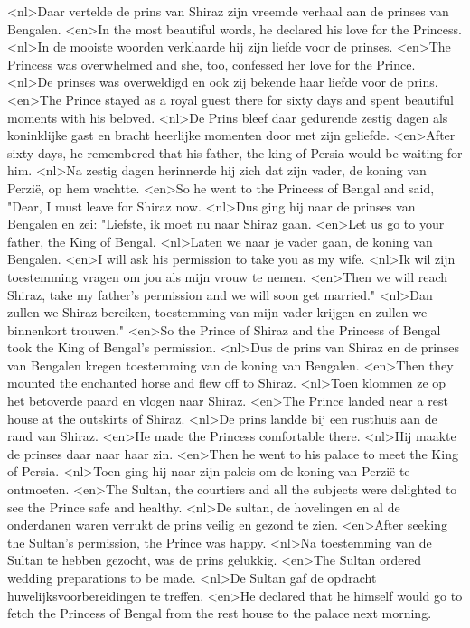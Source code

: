 <nl>Daar vertelde de prins van Shiraz zijn vreemde verhaal aan de prinses van Bengalen.
<en>In the most beautiful words, he declared his love for the Princess.
<nl>In de mooiste woorden verklaarde hij zijn liefde voor de prinses.
<en>The Princess was overwhelmed and she, too, confessed her love for the Prince.
<nl>De prinses was overweldigd en ook zij bekende haar liefde voor de prins.
<en>The Prince stayed as a royal guest there for sixty days and spent beautiful moments with his beloved.
<nl>De Prins bleef daar gedurende zestig dagen als koninklijke gast en bracht heerlijke momenten door met zijn geliefde.
<en>After sixty days, he remembered that his father, the king of Persia would be waiting for him.
<nl>Na zestig dagen herinnerde hij zich dat zijn vader, de koning van Perzië, op hem  wachtte.
<en>So he went to the Princess of Bengal and said, "Dear, I must leave for Shiraz now.
<nl>Dus ging hij naar de prinses van Bengalen en zei: "Liefste, ik moet nu naar Shiraz gaan.
<en>Let us go to your father, the King of Bengal.
<nl>Laten we naar je vader gaan, de koning van Bengalen.
<en>I will ask his permission to take you as my wife.
<nl>Ik wil zijn toestemming vragen om jou als mijn vrouw te nemen.
<en>Then we will reach Shiraz, take my father's permission and we will soon get married."
<nl>Dan zullen we Shiraz bereiken, toestemming van mijn vader krijgen en zullen we binnenkort trouwen."
<en>So the Prince of Shiraz and the Princess of Bengal took the King of Bengal's permission.
<nl>Dus de prins van Shiraz en de prinses van Bengalen kregen toestemming van de koning van Bengalen.
<en>Then they mounted the enchanted horse and flew off to Shiraz.
<nl>Toen klommen ze op het betoverde paard en vlogen naar Shiraz.
<en>The Prince landed near a rest house at the outskirts of Shiraz.
<nl>De prins landde bij een rusthuis aan de rand van Shiraz.
<en>He made the Princess comfortable there.
<nl>Hij maakte de prinses daar naar haar zin.
<en>Then he went to his palace to meet the King of Persia.
<nl>Toen ging hij naar zijn paleis om de koning van Perzië te ontmoeten.
<en>The Sultan, the courtiers and all the subjects were delighted to see the Prince safe and healthy.
<nl>De sultan, de hovelingen en al de onderdanen waren verrukt  de prins veilig en gezond te zien.
<en>After seeking the Sultan's permission, the Prince was happy.
<nl>Na toestemming van de Sultan te hebben gezocht, was de prins gelukkig.
<en>The Sultan ordered wedding preparations to be made.
<nl>De Sultan gaf de opdracht huwelijksvoorbereidingen te treffen.
<en>He declared that he himself would go to fetch the Princess of Bengal from the rest house to the palace next morning.
